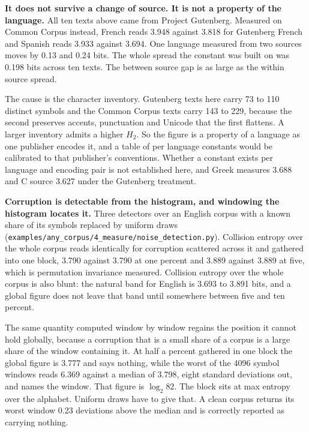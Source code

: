 \textbf{It does not survive a change of source. It is not a property of the language.} All ten texts above came from Project Gutenberg. Measured on Common Corpus instead, French reads 3.948 against 3.818 for Gutenberg French and Spanish reads 3.933 against 3.694. One language measured from two sources moves by 0.13 and 0.24 bits. The whole spread the constant was built on was 0.198 bits across ten texts. The between source gap is as large as the within source spread.

The cause is the character inventory. Gutenberg texts here carry 73 to 110 distinct symbols and the Common Corpus texts carry 143 to 229, because the second preserves accents, punctuation and Unicode that the first flattens. A larger inventory admits a higher \(H_2\). So the figure is a property of a language as one publisher encodes it, and a table of per language constants would be calibrated to that publisher's conventions. Whether a constant exists per language and encoding pair is not established here, and Greek measures 3.688 and C source 3.627 under the Gutenberg treatment.

\textbf{Corruption is detectable from the histogram, and windowing the histogram locates it.} Three detectors over an English corpus with a known share of its symbols replaced by uniform draws (\texttt{examples/\allowbreak{}any\_\allowbreak{}corpus/\allowbreak{}4\_\allowbreak{}measure/\allowbreak{}noise\_\allowbreak{}detection.\allowbreak{}py}). Collision entropy over the whole corpus reads identically for corruption scattered across it and gathered into one block, 3.790 against 3.790 at one percent and 3.889 against 3.889 at five, which is permutation invariance measured. Collision entropy over the whole corpus is also blunt: the natural band for English is 3.693 to 3.891 bits, and a global figure does not leave that band until somewhere between five and ten percent.

The same quantity computed window by window regains the position it cannot hold globally, because a corruption that is a small share of a corpus is a large share of the window containing it. At half a percent gathered in one block the global figure is 3.777 and says nothing, while the worst of the 4096 symbol windows reads 6.369 against a median of 3.798, eight standard deviations out, and names the window. That figure is \(\log_2 82\). The block sits at max entropy over the alphabet. Uniform draws have to give that. A clean corpus returns its worst window 0.23 deviations above the median and is correctly reported as carrying nothing.


